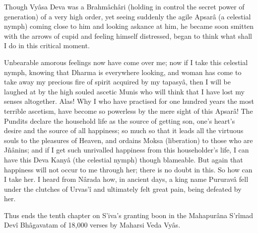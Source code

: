  

Though Vyâsa Deva was a Brahmâchâri (holding in control the secret power of generation) of a very high order, yet seeing suddenly the agile Apsarâ (a celestial nymph) coming close to him and looking askance at him, he became soon smitten with the arrows of cupid and feeling himself distressed, began to think what shall I do in this critical moment.

 

Unbearable amorous feelings now have come over me; now if I take this celestial nymph, knowing that Dharma is everywhere looking, and woman has come to take away my precious fire of spirit acquired by my tapasyâ, then I will be laughed at by the high souled ascetic Munis who will think that I have lost my senses altogether. Alas! Why I who have practised for one hundred years the most terrible ascetism, have become so powerless by the mere sight of this Apsarâ! The Pundits declare the household life as the source of getting son, one's heart’s desire and the source of all happiness; so much so that it leads all the virtuous souls to the pleasures of Heaven, and ordains Moksa (liberation) to those who are Jñânins; and if I get such unrivalled happiness from this householder's life, I can have this Deva Kanyâ (the celestial nymph) though blameable. But again that happiness will not occur to me through her; there is no doubt in this. So how can I take her. I heard from Nârada how, in ancient days, a king name Pururavâ fell under the clutches of Urvas'î and ultimately felt great pain, being defeated by her.

 

Thus ends the tenth chapter on S’iva's granting boon in the Mahapurâna S’rîmad Devî Bhâgavatam of 18,000 verses by Maharsi Veda Vyâs.